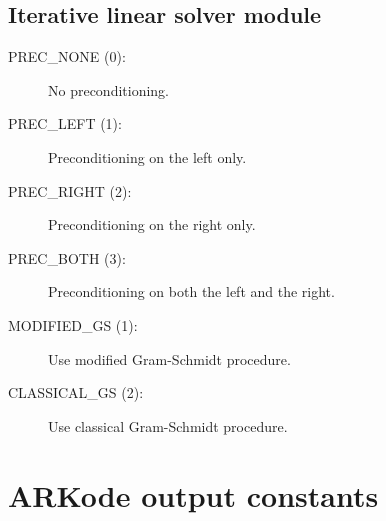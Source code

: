 \documentclass[letterpaper,10pt,english]{sphinxmanual}
\begin{document}
\subsection{Iterative linear solver module}
\label{Constants:iterative-linear-solver-module}\begin{description}
\item[{PREC\_NONE  (0):}] \leavevmode
No preconditioning.

\item[{PREC\_LEFT  (1):}] \leavevmode
Preconditioning on the left only.

\item[{PREC\_RIGHT  (2):}] \leavevmode
Preconditioning on the right only.

\item[{PREC\_BOTH  (3):}] \leavevmode
Preconditioning on both the left and the right.

\item[{MODIFIED\_GS  (1):}] \leavevmode
Use modified Gram-Schmidt procedure.

\item[{CLASSICAL\_GS  (2):}] \leavevmode
Use classical Gram-Schmidt procedure.

\end{description}


\section{ARKode output constants}
\label{Constants:arkode-output-constants}
\end{document}
